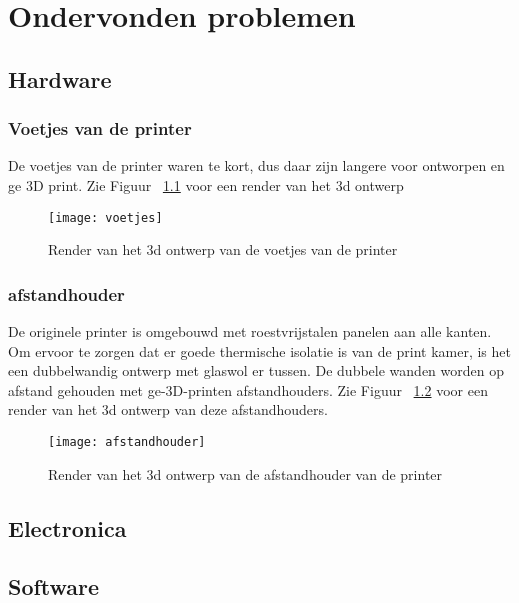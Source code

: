 \chapter{Ondervonden problemen}
\label{Ondervonden_problemen}

\section{Hardware}

\subsection{Voetjes van de printer}

De voetjes van de printer waren te kort, dus daar zijn langere voor
ontworpen en ge 3D print. Zie Figuur ~\ref{fig:voetjes} voor een render van
het 3d ontwerp

\begin{figure}[h]
\centerline{\texttt{[image: voetjes]}}
\caption{Render van het 3d ontwerp van de voetjes van de printer}
\label{fig:voetjes}
\end{figure}

\subsection{afstandhouder}

De originele printer is omgebouwd met roestvrijstalen panelen aan alle kanten.
Om ervoor te zorgen dat er goede thermische isolatie is van de print kamer, is
het een dubbelwandig ontwerp met glaswol er tussen. De dubbele wanden worden op
afstand gehouden met ge-3D-printen afstandhouders. Zie Figuur
~\ref{fig:afstandhouder} voor een render van het 3d ontwerp van deze
afstandhouders.

\begin{figure}[h]
\centerline{\texttt{[image: afstandhouder]}}
\caption{Render van het 3d ontwerp van de afstandhouder van de printer}
\label{fig:afstandhouder}
\end{figure}


\section{Electronica}
\section{Software}
